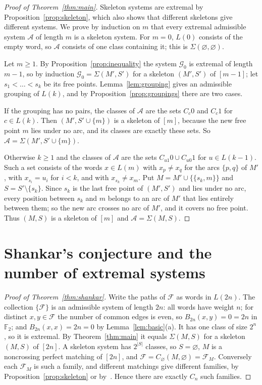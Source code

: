 \documentclass[11pt]{amsart}
\theoremstyle{definition}
\theoremstyle{remark}
\numberwithin{equation}{section}
\newcommand{\F}{\mathbb{F}}
\newcommand{\cA}{\mathcal{A}}
\newcommand{\cG}{\mathcal{G}}
\begin{document}
\begin{proof}[Proof of Theorem~\ref{thm:main}]
Skeleton systems are extremal by Proposition~\ref{prop:skeleton}, which also shows that different skeletons give different systems. We prove by induction on $m$ that every extremal admissible system $\cA$ of length $m$ is a skeleton system. For $m=0$, $L(0)$ consists of the empty word, so $\cA$ consists of one class containing it; this is $\Sigma(\varnothing,\varnothing)$.

Let $m\ge1$. By Proposition~\ref{prop:inequality} the system $\cG_0$ is extremal of length $m-1$, so by induction $\cG_0=\Sigma(M',S')$ for a skeleton $(M',S')$ of $[m-1]$; let $s_1<\dots<s_k$ be its free points. Lemma~\ref{lem:grouping} gives an admissible grouping of $L(k)$, and by Proposition~\ref{prop:groupings} there are two cases.

If the grouping has no pairs, the classes of $\cA$ are the sets $C_c0$ and $C_c1$ for $c\in L(k)$. Then $(M',S'\cup\{m\})$ is a skeleton of $[m]$, because the new free point $m$ lies under no arc, and its classes are exactly these sets. So $\cA=\Sigma(M',S'\cup\{m\})$.

Otherwise $k\ge1$ and the classes of $\cA$ are the sets $C_{u1}0\cup C_{u0}1$ for $u\in L(k-1)$. Such a set consists of the words $x\in L(m)$ with $x_p\ne x_q$ for the arcs $\{p,q\}$ of $M'$, with $x_{s_i}=u_i$ for $i<k$, and with $x_{s_k}\ne x_m$. Put $M=M'\cup\{\{s_k,m\}\}$ and $S=S'\setminus\{s_k\}$. Since $s_k$ is the last free point of $(M',S')$ and lies under no arc, every position between $s_k$ and $m$ belongs to an arc of $M'$ that lies entirely between them; so the new arc crosses no arc of $M'$, and it covers no free point. Thus $(M,S)$ is a skeleton of $[m]$ and $\cA=\Sigma(M,S)$.
\end{proof}

\section{Shankar's conjecture and the number of extremal systems}\label{sec:final}

\begin{proof}[Proof of Theorem~\ref{thm:shankar}]
Write the paths of $\mathcal F$ as words in $L(2n)$. The collection $\{\mathcal F\}$ is an admissible system of length $2n$: all words have weight $n$; for distinct $x,y\in\mathcal F$ the number of common edges is even, so $B_{2n}(x,y)=0=2n$ in $\F_2$; and $B_{2n}(x,x)=2n=0$ by Lemma~\ref{lem:basic}(a). It has one class of size $2^n$, so it is extremal. By Theorem~\ref{thm:main} it equals $\Sigma(M,S)$ for a skeleton $(M,S)$ of $[2n]$. A skeleton system has $2^{|S|}$ classes, so $S=\varnothing$, $M$ is a noncrossing perfect matching of $[2n]$, and $\mathcal F=C_\varnothing(M,\varnothing)=\mathcal F_M$. Conversely each $\mathcal F_M$ is such a family, and different matchings give different families, by Proposition~\ref{prop:skeleton} or by~\cite[Section~4]{Sh}. Hence there are exactly $C_n$ such families.
\end{proof}
\end{document}
